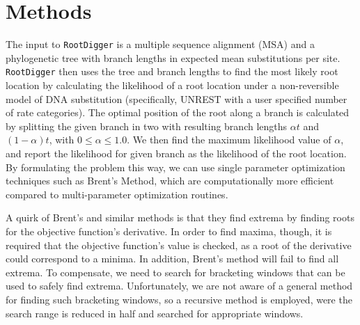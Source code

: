 \documentclass{article}
\newcommand{\RootDiggertt}{\texttt{RootDigger}}
\begin{document}
\section{Methods}

The input to \RootDiggertt{} is a multiple sequence alignment (MSA) and a
phylogenetic tree with branch lengths in expected mean substitutions per site.
\RootDiggertt{} then uses the tree and branch lengths to find the most likely
root location by calculating the likelihood of a root location under a
non-reversible model of DNA substitution (specifically, UNREST
\cite{yang_estimating_1994} with a user specified number of rate categories).
The optimal position of the root along a branch is calculated by splitting the
given branch in two with resulting branch lengths $\alpha t$ and
$(1-\alpha) t$, with $0 \leq \alpha \leq 1.0$.  We then find the maximum likelihood
value of $\alpha$, and report the likelihood for given branch as the likelihood
of the root location.  By formulating the problem this way, we can use single
parameter optimization techniques such as Brent's Method\footnotemark{}, which
are computationally more efficient compared to multi-parameter optimization
routines.


A quirk of Brent's and similar methods is that they find extrema by finding
roots for the objective function's derivative. In order to find maxima, though,
it is required that the objective function's value is checked, as a root of the
derivative could correspond to a minima. In addition, Brent's method will fail
to find all extrema. To compensate, we need to search for bracketing windows
that can be used to safely find extrema.  Unfortunately, we are not aware of a
general method for finding such bracketing windows, so a recursive method is
employed, were the search range is reduced in half and searched for
appropriate\footnotemark{} windows.

\end{document}

